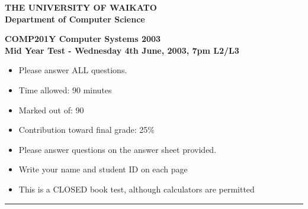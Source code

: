 \documentclass[a4paper,10pt]{article}
\begin{document}
\newcommand{\marks}[1]
{\begin{flushright}{\bf (#1 marks)}\end{flushright}}

{\centering \large \bf THE UNIVERSITY OF WAIKATO\\}
{\centering \large \bf Department of Computer Science\\[0.5cm]}

{\centering \large \bf COMP201Y Computer Systems 2003 \\}
{\centering \large \bf Mid Year Test - Wednesday 4th June, 2003, 7pm L2/L3 \\[1cm]}

\begin{itemize}
  \item Please answer ALL questions.

  \item Time allowed: 90 minutes

  \item Marked out of: 90

  \item Contribution toward final grade: 25\%
  
  \item Please answer questions on the answer sheet provided. 

  \item Write your name and student ID on each page

  \item This is a CLOSED book test, although calculators are permitted
\end{itemize}

\hrule
\end{document}
